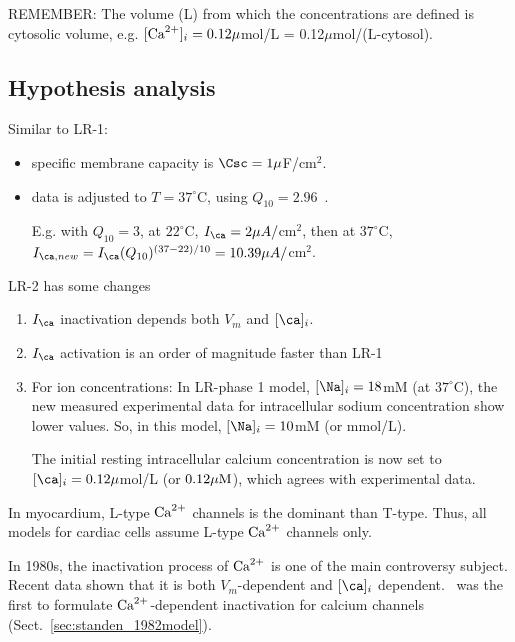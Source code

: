 REMEMBER: The volume (L) from which the concentrations are defined is cytosolic
volume, e.g. $[{\text{Ca}^{2+}}]_i = 0.12\mu$mol/L = 0.12$\mu$mol/(L-cytosol). 

\subsection{Hypothesis analysis}
\label{sec:hypothesis-analysis-4}

Similar to LR-1:
\begin{itemize}
\item specific membrane capacity is $\Csc=1\mu$F/cm$^2$.
\item data is adjusted to $T=37^\circ$C, using
  $Q_{10}=2.96$~\citep{cavalie1985etc}.

  E.g. with $Q_{10}=3$, at $22^\circ$C, $I_\ca=2\mu A/$cm$^2$, then
  at $37^\circ$C, $I_{\ca,new}= I_\ca (Q_{10})^{(37-22)/10} =
  10.39\mu A/$cm$^2$.

\end{itemize}

LR-2 has some changes
\begin{enumerate}
\item $I_\ca$ inactivation depends both $V_m$ and $[\ca]_i$.
\item $I_\ca$ activation is an order of magnitude faster than LR-1
\item For ion concentrations: In LR-phase 1 model,
  $[\Na]_i=18$mM (at $37^\circ$C), the new measured experimental
  data for intracellular sodium concentration show lower values. So,
  in this model, $[\Na]_i=10$mM (or mmol/L). 

  The initial resting intracellular calcium concentration is now set
  to $[\ca]_i=0.12\mu$mol/L (or $0.12{\mu\text{M}}$), which
  agrees with experimental data.
\end{enumerate}

\begin{framed}
In myocardium, L-type ${\text{Ca}^{2+}}$ channels is the dominant than
  T-type. Thus, all models for cardiac cells assume L-type ${\text{Ca}^{2+}}$
  channels only.

In 1980s, the inactivation process of
${\text{Ca}^{2+}}$ is one of the main controversy subject. Recent data shown  that it is both
$V_m$-dependent and $[\ca]_i$  dependent.~\citep{standen1982bsm} was the first
to formulate  ${\text{Ca}^{2+}}$-dependent inactivation for calcium channels
  (Sect.~\ref{sec:standen_1982model}). 
\end{framed}

